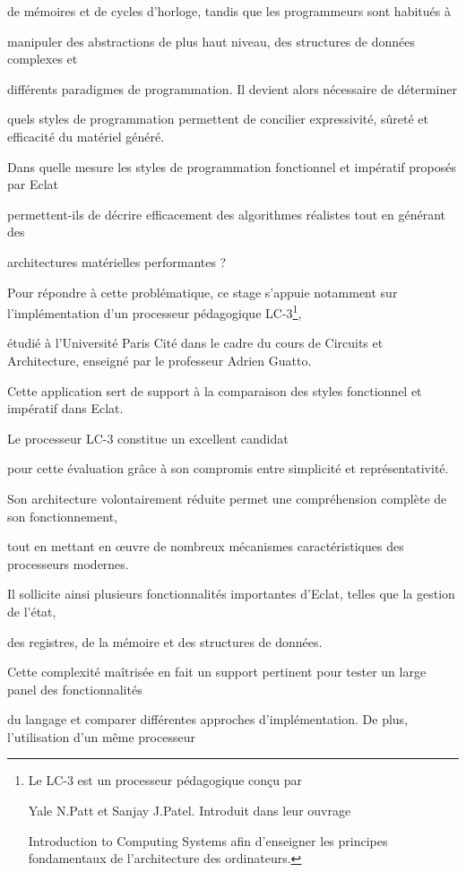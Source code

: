 \documentclass{article}
\begin{document}
de mémoires et de cycles d'horloge, tandis que les programmeurs sont habitués à 

manipuler des abstractions de plus haut niveau, des structures de données complexes et 

différents paradigmes de programmation. Il devient alors nécessaire de déterminer 

quels styles de programmation permettent de concilier expressivité, sûreté et efficacité du matériel généré.

Dans quelle mesure les styles de programmation fonctionnel et impératif proposés par Eclat 

permettent-ils de décrire efficacement des algorithmes réalistes tout en générant des 

architectures matérielles performantes ?


Pour répondre à cette problématique, ce stage s'appuie notamment sur l'implémentation d'un processeur pédagogique LC-3\footnote{Le LC-3 est un processeur pédagogique conçu par 

Yale N.Patt et Sanjay J.Patel. Introduit dans leur ouvrage 

Introduction to Computing Systems afin d'enseigner les principes fondamentaux de l'architecture des ordinateurs.}, 

étudié à l'Université Paris Cité dans le cadre du cours de Circuits et Architecture, enseigné par le professeur Adrien Guatto. 

Cette application sert de support à la comparaison des styles fonctionnel et impératif dans Eclat.

Le processeur LC-3 constitue un excellent candidat 


pour cette évaluation grâce à son compromis entre simplicité et représentativité. 

Son architecture volontairement réduite permet une compréhension complète de son fonctionnement, 

tout en mettant en œuvre de nombreux mécanismes caractéristiques des processeurs modernes. 

Il sollicite ainsi plusieurs fonctionnalités importantes d'Eclat, telles que la gestion de l'état, 

des registres, de la mémoire et des structures de données.

Cette complexité maîtrisée en fait un support pertinent pour tester un large panel des fonctionnalités 

du langage et comparer différentes approches d'implémentation. De plus, l'utilisation d'un même processeur 
\end{document}
